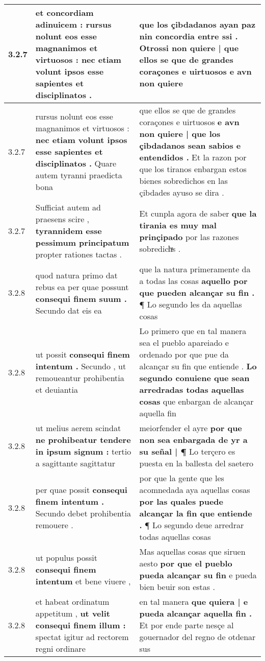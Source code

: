 \begin{tabular}{|p{1cm}|p{6.5cm}|p{6.5cm}|}
3.2.7 & et concordiam adinuicem : \textbf{ rursus nolunt eos esse magnanimos et virtuosos : } nec etiam volunt ipsos esse sapientes et disciplinatos . & que los çibdadanos ayan paz nin concordia entre ssi . \textbf{ Otrossi non quiere | que ellos se que de grandes coraçones e uirtuosos } e avn non quiere \\\hline
3.2.7 & rursus nolunt eos esse magnanimos et virtuosos : \textbf{ nec etiam volunt ipsos esse sapientes et disciplinatos . } Quare autem tyranni praedicta bona & que ellos se que de grandes coraçones e uirtuosos \textbf{ e avn non quiere | que los çibdadanos sean sabios e entendidos . } Et la razon por que los tiranos enbargan estos bienes sobredichos en las çibdades ayuso se dira . \\\hline
3.2.7 & Sufficiat autem ad praesens scire , \textbf{ tyrannidem esse pessimum principatum } propter rationes tactas . & Et cunpla agora de saber \textbf{ que la tirania es muy mal prinçipado } por las razones sobredichͣs . \\\hline
3.2.8 & quod natura primo dat rebus ea per quae possunt \textbf{ consequi finem suum . } Secundo dat eis ea & que la natura primeramente da a todas las cosas \textbf{ aquello por que pueden alcançar su fin . } ¶ Lo segundo les da aquellas cosas \\\hline
3.2.8 & ut possit \textbf{ consequi finem intentum . } Secundo , ut remoueantur prohibentia et deuiantia & Lo primero que en tal manera sea el pueblo apareiado e ordenado por que pue da alcançar su fin que entiende . \textbf{ Lo segundo conuiene que sean arredradas todas aquellas cosas } que enbargan de alcançar aquella fin \\\hline
3.2.8 & ut melius aerem scindat \textbf{ ne prohibeatur tendere in ipsum signum : } tertio a sagittante sagittatur & meiorfender el ayre \textbf{ por que non sea enbargada de yr a su señal | ¶ } Lo terçero es puesta en la ballesta del saetero \\\hline
3.2.8 & per quae possit \textbf{ consequi finem intentum . } Secundo debet prohibentia remouere . & por que la gente que les acomnedada aya aquellas cosas \textbf{ por las quales puede alcançar la fin que entiende . } ¶ Lo segundo deue arredrar todas aquellas cosas \\\hline
3.2.8 & ut populus possit \textbf{ consequi finem intentum } et bene viuere , & Mas aquellas cosas que siruen aesto \textbf{ por que el pueblo pueda alcançar su fin } e pueda bien beuir son estas . \\\hline
3.2.8 & et habeat ordinatum appetitum , \textbf{ ut velit consequi finem illum : } spectat igitur ad rectorem regni ordinare & en tal manera \textbf{ que quiera | e pueda alcançar aquella fin . } Et por ende parte nesçe al gouernador del regno de otdenar sus \\\hline

\end{tabular}
